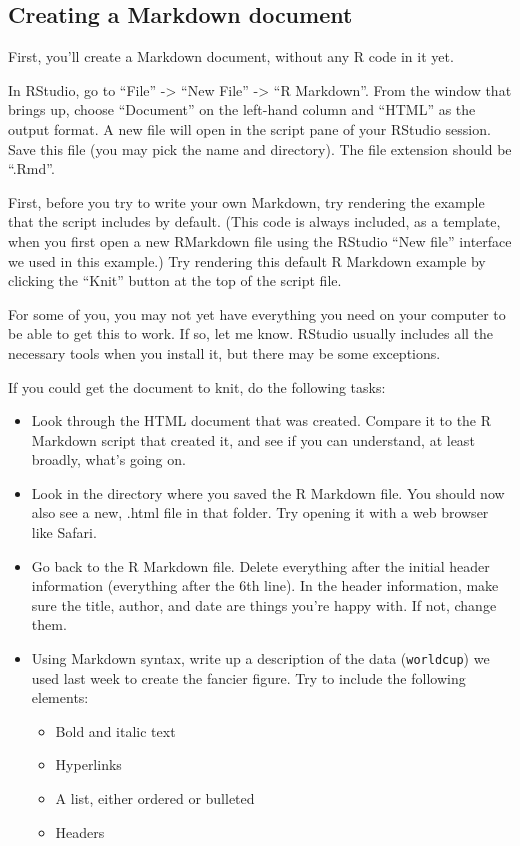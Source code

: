 \documentclass[]{book}
\providecommand{\tightlist}{%
  \setlength{\itemsep}{0pt}\setlength{\parskip}{0pt}}
\begin{document}
\subsection{Creating a Markdown
document}\label{creating-a-markdown-document}

First, you'll create a Markdown document, without any R code in it yet.

In RStudio, go to ``File'' -\textgreater{} ``New File'' -\textgreater{}
``R Markdown''. From the window that brings up, choose ``Document'' on
the left-hand column and ``HTML'' as the output format. A new file will
open in the script pane of your RStudio session. Save this file (you may
pick the name and directory). The file extension should be ``.Rmd''.

First, before you try to write your own Markdown, try rendering the
example that the script includes by default. (This code is always
included, as a template, when you first open a new RMarkdown file using
the RStudio ``New file'' interface we used in this example.) Try
rendering this default R Markdown example by clicking the ``Knit''
button at the top of the script file.

For some of you, you may not yet have everything you need on your
computer to be able to get this to work. If so, let me know. RStudio
usually includes all the necessary tools when you install it, but there
may be some exceptions.

If you could get the document to knit, do the following tasks:

\begin{itemize}
\tightlist
\item
  Look through the HTML document that was created. Compare it to the R
  Markdown script that created it, and see if you can understand, at
  least broadly, what's going on.
\item
  Look in the directory where you saved the R Markdown file. You should
  now also see a new, .html file in that folder. Try opening it with a
  web browser like Safari.
\item
  Go back to the R Markdown file. Delete everything after the initial
  header information (everything after the 6th line). In the header
  information, make sure the title, author, and date are things you're
  happy with. If not, change them.
\item
  Using Markdown syntax, write up a description of the data
  (\texttt{worldcup}) we used last week to create the fancier figure.
  Try to include the following elements:

  \begin{itemize}
  \tightlist
  \item
    Bold and italic text
  \item
    Hyperlinks
  \item
    A list, either ordered or bulleted
  \item
    Headers
  \end{itemize}
\end{itemize}
\end{document}
